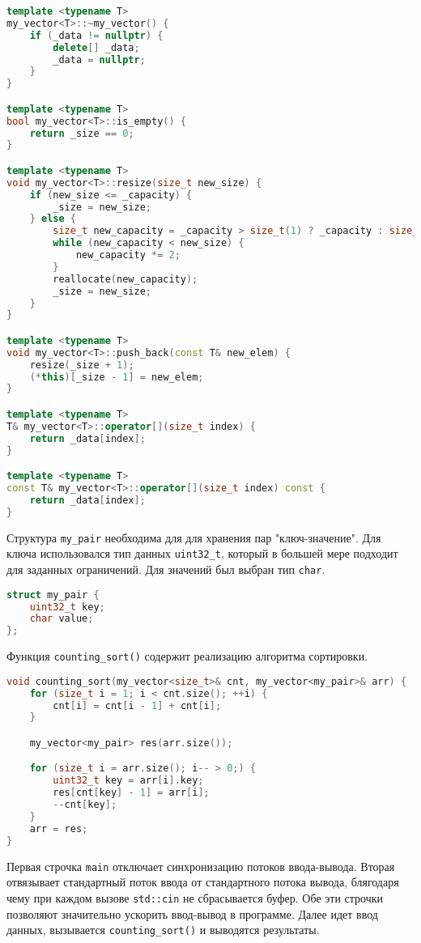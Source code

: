 \documentclass[12pt]{article}
\begin{document}
\begin{lstlisting}[language=C++]
template <typename T>
my_vector<T>::~my_vector() {
    if (_data != nullptr) {
        delete[] _data;
        _data = nullptr;
    }
}

template <typename T>
bool my_vector<T>::is_empty() {
    return _size == 0;
}

template <typename T>
void my_vector<T>::resize(size_t new_size) {
    if (new_size <= _capacity) {
        _size = new_size;
    } else {
        size_t new_capacity = _capacity > size_t(1) ? _capacity : size_t(1);
        while (new_capacity < new_size) {
            new_capacity *= 2;
        }
        reallocate(new_capacity);
        _size = new_size;
    }
}

template <typename T>
void my_vector<T>::push_back(const T& new_elem) {
    resize(_size + 1);
    (*this)[_size - 1] = new_elem;
}

template <typename T>
T& my_vector<T>::operator[](size_t index) {
    return _data[index];
}

template <typename T>
const T& my_vector<T>::operator[](size_t index) const {
    return _data[index];
}
\end{lstlisting}
Структура \texttt{my\_pair} необходима для для хранения пар "ключ-значение". Для ключа использовался тип данных \texttt{uint32\_t}, который в большей мере подходит для заданных ограничений. Для значений был выбран тип \texttt{char}.
\begin{lstlisting}[language=C++]
struct my_pair {
    uint32_t key;
    char value;
};
\end{lstlisting}
Функция \texttt{counting\_sort()} содержит реализацию алгоритма сортировки. 

\begin{lstlisting}[language=C++]
void counting_sort(my_vector<size_t>& cnt, my_vector<my_pair>& arr) {
    for (size_t i = 1; i < cnt.size(); ++i) {
        cnt[i] = cnt[i - 1] + cnt[i];
    }

    my_vector<my_pair> res(arr.size());

    for (size_t i = arr.size(); i-- > 0;) {
        uint32_t key = arr[i].key;
        res[cnt[key] - 1] = arr[i];
        --cnt[key];
    }
    arr = res;
}
\end{lstlisting}

Первая строчка \texttt{main} отключает синхронизацию потоков ввода-вывода. Вторая отвязывает стандартный поток ввода от стандартного потока вывода, блягодаря чему при каждом вызове \texttt{std::cin} не сбрасывается буфер. Обе эти строчки позволяют значительно ускорить ввод-вывод в программе. Далее идет ввод данных, вызывается \texttt{counting\_sort()} и выводятся результаты.
\end{document}

